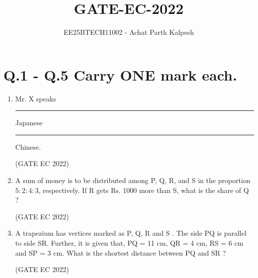 \documentclass[journal,12pt,onecolumn]{IEEEtran}
\title{GATE-EC-2022}
\author{EE25BTECH11002 - Achat Parth Kalpesh }
\date{}
\theoremstyle{remark}
\begin{document}
\maketitle

\section*{Q.1 - Q.5  Carry ONE mark each. }

\begin{enumerate}
    \item Mr. X speaks \rule{2cm}{0.4pt} Japanese \rule{2cm}{0.4pt} Chinese.

    \hfill{(GATE EC 2022)}
    \begin{enumerate}
    \end{enumerate}

    \item A sum of money is to be distributed among P, Q, R, and S in the proportion $5:2:4:3$, respectively.
    If R gets Rs. 1000 more than S, what is the share of Q ?

    \hfill{(GATE EC 2022)}
    \begin{enumerate}
    \end{enumerate}

    \item A trapezium has vertices marked as P, Q, R and S . The side PQ is parallel to side SR.
    Further, it is given that, PQ = 11 cm, QR = 4 cm, RS = 6 cm and SP = 3 cm.
    What is the shortest distance between PQ and SR ?

    \hfill{(GATE EC 2022)}
    \begin{enumerate}
    \end{enumerate}


\end{enumerate}
\end{document}
